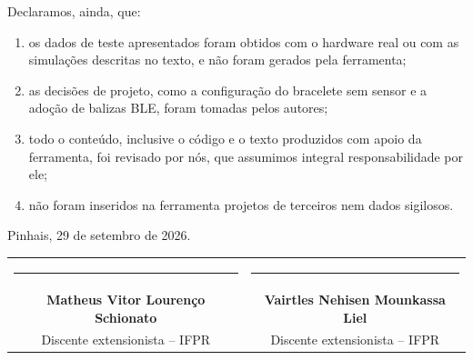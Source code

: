 \bigskip
\noindent
Declaramos, ainda, que:
\begin{enumerate}[label=\alph*)]
  \item os dados de teste apresentados foram obtidos com o hardware real ou com as simulações descritas no texto, e não foram gerados pela ferramenta;
  \item as decisões de projeto, como a configuração do bracelete sem sensor e a adoção de balizas BLE, foram tomadas pelos autores;
  \item todo o conteúdo, inclusive o código e o texto produzidos com apoio da ferramenta, foi revisado por nós, que assumimos integral responsabilidade por ele;
  \item não foram inseridos na ferramenta projetos de terceiros nem dados sigilosos.
\end{enumerate}

\bigskip
\noindent
Pinhais, 29 de setembro de 2026.

\bigskip\bigskip\bigskip
\begin{center}
\begin{tabular}{cc}
\rule{6.5cm}{0.5pt} & \rule{6.5cm}{0.5pt} \\
\textbf{Matheus Vitor Lourenço Schionato} & \textbf{Vairtles Nehisen Mounkassa Liel} \\
Discente extensionista -- IFPR & Discente extensionista -- IFPR
\end{tabular}
\end{center}
